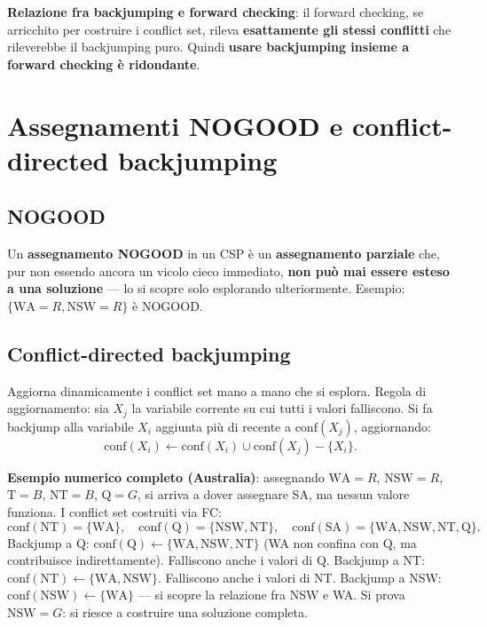 \documentclass[11pt,a4paper]{report}
\begin{document}
\textbf{Relazione fra backjumping e forward checking}: il forward checking, se arricchito per costruire i conflict set, rileva \textbf{esattamente gli stessi conflitti} che rileverebbe il backjumping puro. Quindi \textbf{usare backjumping insieme a forward checking è ridondante}.

\section{Assegnamenti NOGOOD e conflict-directed backjumping}

\subsection*{NOGOOD}

Un \textbf{assegnamento NOGOOD} in un CSP è un \textbf{assegnamento parziale} che, pur non essendo ancora un vicolo cieco immediato, \textbf{non può mai essere esteso a una soluzione} --- lo si scopre solo esplorando ulteriormente. Esempio: $\{\text{WA}{=}R,\text{NSW}{=}R\}$ è NOGOOD.

\subsection*{Conflict-directed backjumping}

Aggiorna dinamicamente i conflict set mano a mano che si esplora. Regola di aggiornamento: sia $X_j$ la variabile corrente su cui tutti i valori falliscono. Si fa backjump alla variabile $X_i$ aggiunta più di recente a $\text{conf}(X_j)$, aggiornando:
\[
\text{conf}(X_i) \leftarrow \text{conf}(X_i) \cup \text{conf}(X_j) - \{X_i\}.
\]

\textbf{Esempio numerico completo (Australia)}: assegnando $\text{WA}{=}R$, $\text{NSW}{=}R$, $\text{T}{=}B$, $\text{NT}{=}B$, $\text{Q}{=}G$, si arriva a dover assegnare SA, ma nessun valore funziona. I conflict set costruiti via FC:
\[
\text{conf}(\text{NT})=\{\text{WA}\}, \quad \text{conf}(\text{Q})=\{\text{NSW},\text{NT}\}, \quad \text{conf}(\text{SA})=\{\text{WA},\text{NSW},\text{NT},\text{Q}\}.
\]
Backjump a Q: $\text{conf}(\text{Q}) \leftarrow \{\text{WA},\text{NSW},\text{NT}\}$ (WA non confina con Q, ma contribuisce indirettamente). Falliscono anche i valori di Q. Backjump a NT: $\text{conf}(\text{NT}) \leftarrow \{\text{WA},\text{NSW}\}$. Falliscono anche i valori di NT. Backjump a NSW: $\text{conf}(\text{NSW}) \leftarrow \{\text{WA}\}$ --- si scopre la relazione fra NSW e WA. Si prova $\text{NSW}{=}G$: si riesce a costruire una soluzione completa.
\end{document}
